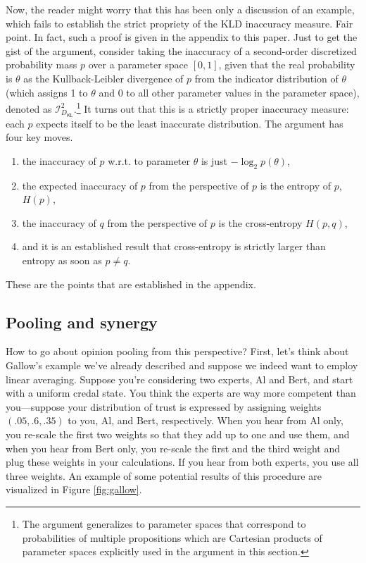 \documentclass[
  10pt,
  dvipsnames,enabledeprecatedfontcommands]{scrartcl}
\newcommand{\dkl}{D_{\mathsf{KL}}} %
\begin{document}
Now, the reader might worry that this has been only a discussion of an
example, which fails to establish the strict propriety of the KLD
inaccuracy measure. Fair point. In fact, such a proof is given in the
appendix to this paper. Just to get the gist of the argument, consider
taking the inaccuracy of a second-order discretized probability mass
\(p\) over a parameter space \([0,1]\), given that the real probability
is \(\theta\) as the Kullback-Leibler divergence of \(p\) from the
indicator distribution of \(\theta\) (which assigns 1 to \(\theta\) and
0 to all other parameter values in the parameter space), denoted as
\(\mathcal{I}_{\dkl}^2\).\footnote{The argument generalizes to parameter spaces that correspond to probabilities of multiple propositions which are Cartesian products of parameter spaces explicitly used in the argument in this section.}
It turns out that this is a strictly proper inaccuracy measure: each
\(p\) expects itself to be the least inaccurate distribution. The
argument has four key moves.

\begin{enumerate}
\item the inaccuracy of $p$ w.r.t. to parameter $\theta$ is just $- \log_2 p(\theta)$,
\item  the expected inaccuracy of $p$ from the perspective of $p$ is the entropy of $p$, $H(p)$,
\item  the inaccuracy of $q$ from the perspective of $p$ is the cross-entropy $H(p,q)$,
\item and it is an established result that cross-entropy is strictly larger than entropy as soon as $p\neq q$.
  \end{enumerate}

These are the points that are established in the appendix.

\hypertarget{pooling-and-synergy-1}{%
\subsection{Pooling and synergy}\label{pooling-and-synergy-1}}

How to go about opinion pooling from this perspective? First, let's
think about Gallow's example we've already described and suppose we
indeed want to employ linear averaging. Suppose you're considering two
experts, Al and Bert, and start with a uniform credal state. You think
the experts are way more competent than you---suppose your distribution
of trust is expressed by assigning weights \((.05,.6,.35)\) to you, Al,
and Bert, respectively. When you hear from Al only, you re-scale the
first two weights so that they add up to one and use them, and when you
hear from Bert only, you re-scale the first and the third weight and
plug these weights in your calculations. If you hear from both experts,
you use all three weights. An example of some potential results of this
procedure are visualized in Figure \ref{fig:gallow}.
\end{document}
